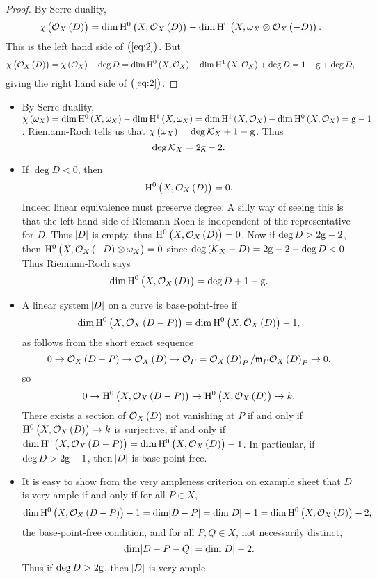 \begin{proof}
By Serre duality,
$$ \chi\br{\OOO_X\br{D}} = \dim \H^0\br{X, \OOO_X\br{D}} - \dim \H^0\br{X, \omega_X \otimes \OOO_X\br{-D}}. $$
This is the left hand side of $ \br{\ref{eq:2}} $. But
$$ \chi\br{\OOO_X\br{D}} = \chi\br{\OOO_X} + \deg D = \dim \H^0\br{X, \OOO_X} - \dim \H^1\br{X, \OOO_X} + \deg D = 1 - \g + \deg D, $$
giving the right hand side of $ \br{\ref{eq:2}} $.
\end{proof}


\begin{remark*}
\hfill
\begin{itemize}
\item By Serre duality, $ \chi\br{\omega_X} = \dim \H^0\br{X, \omega_X} - \dim \H^1\br{X, \omega_X} = \dim \H^1\br{X, \OOO_X} - \dim \H^0\br{X, \OOO_X} = \g - 1 $. Riemann-Roch tells us that $ \chi\br{\omega_X} = \deg \KKK_X + 1 - \g $. Thus
$$ \deg \mathcal{K}_X = 2\mathrm{g} - 2. $$
\item If $ \deg D < 0 $, then
$$ \H^0\br{X, \OOO_X\br{D}} = 0. $$
Indeed linear equivalence must preserve degree. A silly way of seeing this is that the left hand side of Riemann-Roch is independent of the representative for $ D $. Thus $ \abs{D} $ is empty, thus $ \H^0\br{X, \OOO_X\br{D}} = 0 $. Now if $ \deg D > 2\mathrm{g} - 2 $, then $ \H^0\br{X, \OOO_X\br{-D} \otimes \omega_X} = 0 $ since $ \deg \br{\KKK_X - D} = 2\g - 2 - \deg D < 0 $. Thus Riemann-Roch says
$$ \dim \H^0\br{X, \OOO_X\br{D}} = \deg D + 1 - \g. $$
\item A linear system $ \abs{D} $ on a curve is base-point-free if
$$ \dim \H^0\br{X, \OOO_X\br{D - P}} = \dim \H^0\br{X, \OOO_X\br{D}} - 1, $$
as follows from the short exact sequence
$$ 0 \to \OOO_X\br{D - P} \to \OOO_X\br{D} \to \OOO_P = \OOO_X\br{D}_P / \mmm_P\OOO_X\br{D}_P \to 0, $$
so
$$ 0 \to \H^0\br{X, \OOO_X\br{D - P}} \to \H^0\br{X, \OOO_X\br{D}} \to k. $$
There exists a section of $ \OOO_X\br{D} $ not vanishing at $ P $ if and only if $ \H^0\br{X, \OOO_X\br{D}} \to k $ is surjective, if and only if $ \dim \H^0\br{X, \OOO_X\br{D - P}} = \dim \H^0\br{X, \OOO_X\br{D}} - 1 $. In particular, if $ \deg D > 2\mathrm{g} - 1 $, then $ \abs{D} $ is base-point-free.

\pagebreak

\item It is easy to show from the very ampleness criterion on example sheet that $ D $ is very ample if and only if for all $ P \in X $,
$$ \dim \H^0\br{X, \OOO_X\br{D - P}} - 1 = \dim \abs{D - P} = \dim \abs{D} - 1 = \dim \H^0\br{X, \OOO_X\br{D}} - 2, $$
the base-point-free condition, and for all $ P, Q \in X $, not necessarily distinct,
$$ \dim \abs{D - P - Q} = \dim \abs{D} - 2. $$
Thus if $ \deg D > 2\mathrm{g} $, then $ \abs{D} $ is very ample.
\end{itemize}
\end{remark*}

